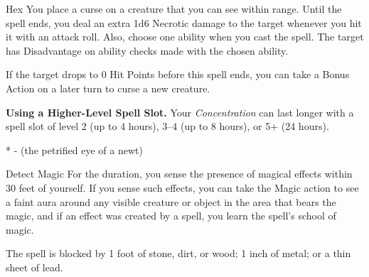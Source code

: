 \begin{Spell}[
  tags=Concentration,
  level=1st,
  time=1 Bonus Action,
  range=90 ft.,
  components={V, S, M*},
  duration=1 Hour,
  school=Enchantment,
  attack=None,
  effect=Necrotic
]{Hex}
You place a curse on a creature that you can see within range. Until the spell ends, you deal an extra 1d6 Necrotic damage to the target whenever you hit it with an attack roll. Also, choose one ability when you cast the spell. The target has Disadvantage on ability checks made with the chosen ability.

If the target drops to 0 Hit Points before this spell ends, you can take a Bonus Action on a later turn to curse a new creature.

\textbf{Using a Higher-Level Spell Slot.} Your \textit{Concentration} can last longer with a spell slot of level 2 (up to 4 hours), 3–4 (up to 8 hours), or 5+ (24 hours).

* - (the petrified eye of a newt)

\end{Spell}

\begin{Spell}[
  tags={Concentration, Ritual},
  level=1st,
  time=1 Action,
  range=Self (30 ft.),
  components={V, S},
  duration=10 Minutes,
  school=Divination,
  attack=None,
  effect=Detection
]{Detect Magic}
For the duration, you sense the presence of magical effects within 30 feet of yourself. If you sense such effects, you can take the Magic action to see a faint aura around any visible creature or object in the area that bears the magic, and if an effect was created by a spell, you learn the spell's school of magic.

The spell is blocked by 1 foot of stone, dirt, or wood; 1 inch of metal; or a thin sheet of lead.
\end{Spell}

